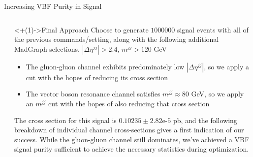 \documentclass[]{beamer}
\begin{document}
\begin{frame}{Increasing VBF Purity in Signal}
\begin{columns}
\begin{column}{0.45\linewidth}
{{
                }
            }
        \end{column}
        \begin{column}{0.45\linewidth}
            \begin{block}<+(1)->{Final Approach}
                Choose to generate $1000000$ signal events with all of the previous commands/setting, along with the following additional MadGraph selections. \newline
                $|\Delta \eta^{jj}| > 2.4$, $m^{jj} > 120$ GeV
                \begin{itemize}
                    \item The gluon-gluon channel exhibits predominately low $|\Delta \eta^{jj}|$, so we apply a cut with the hopes of reducing its cross section
                    \item The vector boson resonance channel satisfies $m^{jj} \approx 80$ GeV, so we apply an $m^{jj}$ cut with the hopes of also reducing that cross section
                \end{itemize}
                The cross section for this signal is $0.10235 \pm 2.82\text{e-}5$ pb, and the following breakdown of individual channel cross-sections gives a first indication of our success. While the gluon-gluon channel still dominates, we've achieved a VBF signal purity sufficient to achieve the necessary statistics during optimization.
            \end{block}
            
            \bigskip
            

\end{column}
\end{columns}
\end{frame}
\end{document}
